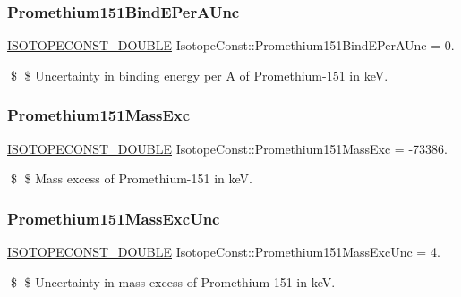 \subsubsection{\texorpdfstring{Promethium151\+Bind\+E\+Per\+A\+Unc}{Promethium151BindEPerAUnc}}
{\footnotesize\ttfamily \mbox{\hyperlink{group___isotope_const-_macros_ga8f45a7272ce02c0b4c65c44636ed719a}{I\+S\+O\+T\+O\+P\+E\+C\+O\+N\+S\+T\+\_\+\+D\+O\+U\+B\+LE}} Isotope\+Const\+::\+Promethium151\+Bind\+E\+Per\+A\+Unc = 0.}

\$ \$ Uncertainty in binding energy per A of Promethium-\/151 in keV. \mbox{\label{group___isotope_const-_promethium-_pm151_gafb046c96acd40778c01573580d655787}} 
\subsubsection{\texorpdfstring{Promethium151\+Mass\+Exc}{Promethium151MassExc}}
{\footnotesize\ttfamily \mbox{\hyperlink{group___isotope_const-_macros_ga8f45a7272ce02c0b4c65c44636ed719a}{I\+S\+O\+T\+O\+P\+E\+C\+O\+N\+S\+T\+\_\+\+D\+O\+U\+B\+LE}} Isotope\+Const\+::\+Promethium151\+Mass\+Exc = -\/73386.}

\$ \$ Mass excess of Promethium-\/151 in keV. \mbox{\label{group___isotope_const-_promethium-_pm151_ga68fd6cc94cf4a30f579165837a650769}} 
\subsubsection{\texorpdfstring{Promethium151\+Mass\+Exc\+Unc}{Promethium151MassExcUnc}}
{\footnotesize\ttfamily \mbox{\hyperlink{group___isotope_const-_macros_ga8f45a7272ce02c0b4c65c44636ed719a}{I\+S\+O\+T\+O\+P\+E\+C\+O\+N\+S\+T\+\_\+\+D\+O\+U\+B\+LE}} Isotope\+Const\+::\+Promethium151\+Mass\+Exc\+Unc = 4.}

\$ \$ Uncertainty in mass excess of Promethium-\/151 in keV. \mbox{\label{group___isotope_const-_promethium-_pm151_ga6160ed25a08d64d7d3850ccb4aec5af1}} 
